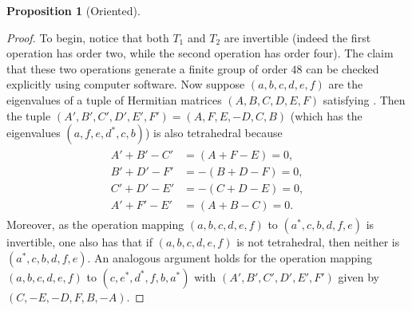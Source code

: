\documentclass[notitlepage, 11pt, letterpaper]{amsart}
\theoremstyle{plain}
\newtheorem{prop}[thm]{Proposition}
\theoremstyle{definition}
\let\cref\crtcref
\newcommand{\ea}{a}
\newcommand{\eb}{b}
\newcommand{\ec}{c}
\newcommand{\ed}{d}
\newcommand{\ee}{e}
\newcommand{\ef}{f}
\begin{document}
\begin{prop}[Oriented]
\end{prop}
\begin{proof}
    To begin, notice that both $T_1$ and $T_2$ are invertible (indeed the first operation has order two, while the second operation has order four).
    The claim that these two operations generate a finite group of order $48$ can be checked explicitly using computer software.
    Now suppose $(\ea,\eb,\ec,\ed,\ee,\ef)$ are the eigenvalues of a tuple of Hermitian matrices $(A,B,C,D,E,F)$ satisfying \cref{eq:tet_cond}.
    Then the tuple $(A',B',C',D',E',F') = (A,F,E,-D,C,B)$ (which has the eigenvalues $(\ea, \ef, \ee, \ed^{*}, \ec, \eb)$) is also tetrahedral because
    \begin{align}
        \label{eq:signed_perm_rows}
        \begin{split}
            A'+B'-C' &= (A+F-E) = 0,  \\
            B'+D'-F' &= -(B+D-F) = 0, \\
            C'+D'-E' &= -(C+D-E) = 0, \\
            A'+F'-E' &= (A+B-C) = 0.
        \end{split}
    \end{align}
    Moreover, as the operation mapping $(\ea,\eb,\ec,\ed,\ee,\ef)$ to $(\ea^*, \ec, \eb, \ed, \ef, \ee)$ is invertible, one also has that if $(\ea,\eb,\ec,\ed,\ee,\ef)$ is not tetrahedral, then neither is $(\ea^*, \ec, \eb, \ed, \ef, \ee)$.
    An analogous argument holds for the operation mapping $(\ea,\eb,\ec,\ed,\ee,\ef)$ to $(\ec, \ee^*, \ed^{*}, \ef, \eb, \ea^*)$ with $(A',B',C',D',E',F')$ given by $(C,-E,-D,F,B,-A)$.
\end{proof}
\end{document}
